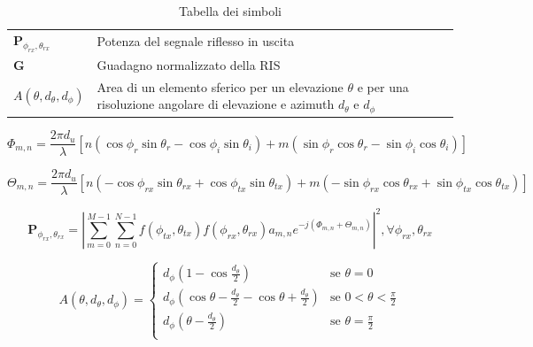 \begin{table}[!ht]
\begin{tabular}{p{}p{}}
    $\textbf{P}_{\phi_{rx},\theta_{rx}}$ & Potenza del segnale riflesso in uscita                                                                                                                                              \\
    $\textbf{G}$                         & Guadagno normalizzato della RIS                                                                                                                                                     \\
    $A(\theta, d_{\theta}, d_{\phi})$    & Area di un elemento sferico per un elevazione $\theta$ e per una risoluzione angolare di elevazione e azimuth $d_{\theta}$ e $d_{\phi}$                                             \\
    \hline
  \end{tabular}
  \caption{Tabella dei simboli}
  \label{tab:symbols}
\end{table}

\begin{equation}
  \label{eq:phase-phi}\Phi_{m,n}= \frac{2\pi d_{u}}{\lambda}[n(\cos{\phi_{r}\sin{\theta_{r}}}
  -\cos{\phi_{i}}\sin{\theta_{i}})+m(\sin{\phi_{r}}\cos{\theta_{r}}-\sin{\phi_{i}}
  \cos{\theta_{i}})]
\end{equation}

\begin{equation}
  \label{eq:phase-theta}\Theta_{m,n}= \frac{2\pi d_{u}}{\lambda}[n(-\cos{\phi_{rx}\sin{\theta_{rx}}}
  +\cos{\phi_{tx}}\sin{\theta_{tx}})+m(-\sin{\phi_{rx}}\cos{\theta_{rx}}+\sin{\phi_{tx}}
  \cos{\theta_{tx}})]
\end{equation}

\begin{equation}
  \label{eq:power}\textbf{P}_{\phi_{rx},\theta_{rx}}= \left|\sum_{m=0}^{M-1}{\sum_{n=0}^{N-1}{f(\phi_{tx}, \theta_{tx})f(\phi_{rx},\theta_{rx})a_{m,n}e^{-j(\Phi_{m,n}+\Theta_{m,n})}}}
  \right|^{2}, \forall \phi_{rx}, \theta_{rx}
\end{equation}

\begin{equation}
  \label{eq:area-spherical-element}A(\theta, d_{\theta}, d_{\phi})=
  \begin{cases}
    d_{\phi}(1-\cos{\frac{d_{\theta}}{2}})                                         & \text{se }\theta = 0                 \\
    d_{\phi}(\cos{\theta-\frac{d_{\theta}}{2}}- \cos{\theta+\frac{d_{\theta}}{2}}) & \text{se }0 < \theta < \frac{\pi}{2} \\
    d_{\phi}(\theta-\frac{d_{\theta}}{2})                                          & \text{se }\theta = \frac{\pi}{2}     \\
  \end{cases}
\end{equation}

